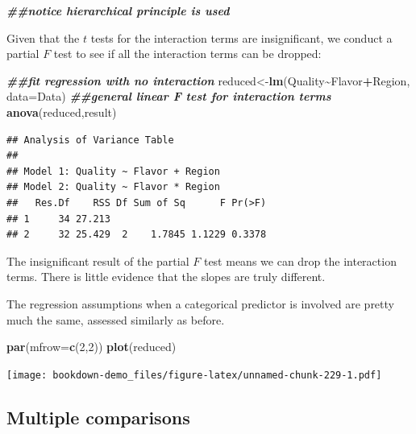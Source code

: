 \documentclass[
]{book}
\newenvironment{Shaded}{\begin{snugshade}}{\end{snugshade}}
\newcommand{\AttributeTok}[1]{\textcolor[rgb]{0.13,0.29,0.53}{#1}}
\newcommand{\DecValTok}[1]{\textcolor[rgb]{0.00,0.00,0.81}{#1}}
\newcommand{\DocumentationTok}[1]{\textcolor[rgb]{0.56,0.35,0.01}{\textbf{\textit{#1}}}}
\newcommand{\FunctionTok}[1]{\textcolor[rgb]{0.13,0.29,0.53}{\textbf{#1}}}
\newcommand{\NormalTok}[1]{#1}
\newcommand{\OtherTok}[1]{\textcolor[rgb]{0.56,0.35,0.01}{#1}}
\newcommand{\SpecialCharTok}[1]{\textcolor[rgb]{0.81,0.36,0.00}{\textbf{#1}}}
\begin{document}
\begin{Shaded}
\begin{Highlighting}[]
\DocumentationTok{\#\#notice hierarchical principle is used}
\end{Highlighting}
\end{Shaded}

Given that the \(t\) tests for the interaction terms are insignificant, we conduct a partial \(F\) test to see if all the interaction terms can be dropped:

\begin{Shaded}
\begin{Highlighting}[]
\DocumentationTok{\#\#fit regression with no interaction}
\NormalTok{reduced}\OtherTok{\textless{}{-}}\FunctionTok{lm}\NormalTok{(Quality}\SpecialCharTok{\textasciitilde{}}\NormalTok{Flavor}\SpecialCharTok{+}\NormalTok{Region, }\AttributeTok{data=}\NormalTok{Data)}
\DocumentationTok{\#\#general linear F test for interaction terms}
\FunctionTok{anova}\NormalTok{(reduced,result)}
\end{Highlighting}
\end{Shaded}

\begin{verbatim}
## Analysis of Variance Table
## 
## Model 1: Quality ~ Flavor + Region
## Model 2: Quality ~ Flavor * Region
##   Res.Df    RSS Df Sum of Sq      F Pr(>F)
## 1     34 27.213                           
## 2     32 25.429  2    1.7845 1.1229 0.3378
\end{verbatim}

The insignificant result of the partial \(F\) test means we can drop the interaction terms. There is little evidence that the slopes are truly different.

The regression assumptions when a categorical predictor is involved are pretty much the same, assessed similarly as before.

\begin{Shaded}
\begin{Highlighting}[]
\FunctionTok{par}\NormalTok{(}\AttributeTok{mfrow=}\FunctionTok{c}\NormalTok{(}\DecValTok{2}\NormalTok{,}\DecValTok{2}\NormalTok{))}
\FunctionTok{plot}\NormalTok{(reduced)}
\end{Highlighting}
\end{Shaded}

\texttt{[image: bookdown-demo\_files/figure-latex/unnamed-chunk-229-1.pdf]}

\hypertarget{multiple-comparisons}{%
\subsection*{Multiple comparisons}\label{multiple-comparisons}}
\end{document}
